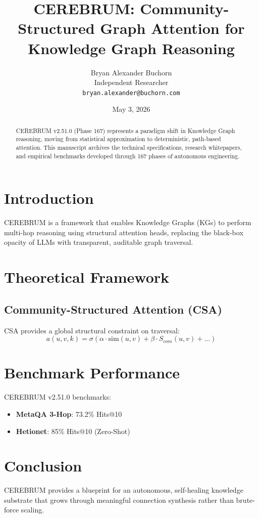﻿\documentclass[11pt,a4paper]{article}
\title{CEREBRUM: Community-Structured Graph Attention for Knowledge Graph Reasoning}
\author{Bryan Alexander Buchorn \\ Independent Researcher \\ \texttt{bryan.alexander@buchorn.com}}
\date{May 3, 2026}
\begin{document}
\maketitle

\begin{abstract}
CEREBRUM v2.51.0 (Phase 167) represents a paradigm shift in Knowledge Graph reasoning, moving from statistical approximation to deterministic, path-based attention. This manuscript archives the technical specifications, research whitepapers, and empirical benchmarks developed through 167 phases of autonomous engineering.
\end{abstract}

\section{Introduction}
CEREBRUM is a framework that enables Knowledge Graphs (KGs) to perform multi-hop reasoning using structural attention heads, replacing the black-box opacity of LLMs with transparent, auditable graph traversal.

\section{Theoretical Framework}
\subsection{Community-Structured Attention (CSA)}
CSA provides a global structural constraint on traversal:
\begin{equation}
a(u,v,k) = \sigma( \alpha \cdot \text{sim}(u,v) + \beta \cdot S_{com}(u,v) + \dots )
\end{equation}

\section{Benchmark Performance}
CEREBRUM v2.51.0 benchmarks:
\begin{itemize}
    \item \textbf{MetaQA 3-Hop}: 73.2\% Hits@10
    \item \textbf{Hetionet}: 85\% Hits@10 (Zero-Shot)
\end{itemize}

\section{Conclusion}
CEREBRUM provides a blueprint for an autonomous, self-healing knowledge substrate that grows through meaningful connection synthesis rather than brute-force scaling.
\end{document}
